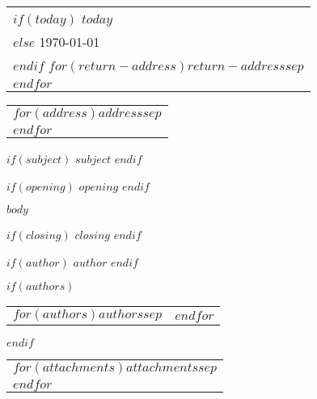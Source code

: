 \documentclass{article}
\begin{document}
\hfill
\begin{tabular}{l@{}}
$if(today)$
  $today$\\[10pt]
$else$
  \today\\[10pt]
$endif$
$for(return-address)$$return-address$$sep$\\$endfor$
\end{tabular}

\bigskip%

\begin{tabular}{@{}l}
$for(address)$$address$$sep$\\$endfor$
\end{tabular}

\bigskip
\bigskip

$if(subject)$
\textbf{$subject$}
$endif$

\bigskip
\bigskip

$if(opening)$
$opening$
$endif$

\bigskip

$body$

\bigskip\bigskip\bigskip

$if(closing)$
$closing$
$endif$

\bigskip\bigskip\bigskip
\bigskip

$if(author)$
$author$
$endif$

$if(authors)$
\begin{tabular}{m{5cm}m{5cm}}
  $for(authors)$$authors$$sep$&$endfor$
\end{tabular}
$endif$


\bigskip\bigskip

\begin{tabular}{@{}l}
$for(attachments)$$attachments$$sep$\\$endfor$
\end{tabular}
\end{document}
